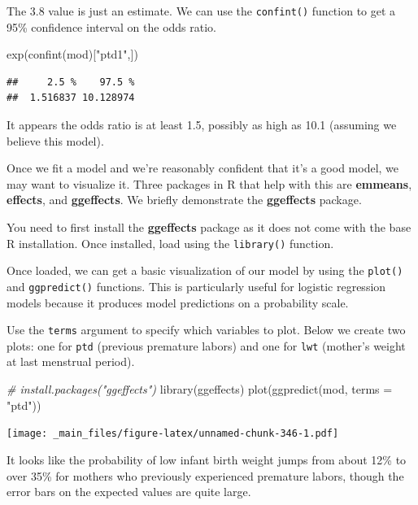 \documentclass[
]{book}
\newenvironment{Shaded}{\begin{snugshade}}{\end{snugshade}}
\newcommand{\AttributeTok}[1]{\textcolor[rgb]{0.77,0.63,0.00}{#1}}
\newcommand{\CommentTok}[1]{\textcolor[rgb]{0.56,0.35,0.01}{\textit{#1}}}
\newcommand{\FunctionTok}[1]{\textcolor[rgb]{0.00,0.00,0.00}{#1}}
\newcommand{\NormalTok}[1]{#1}
\newcommand{\StringTok}[1]{\textcolor[rgb]{0.31,0.60,0.02}{#1}}
\begin{document}
The 3.8 value is just an estimate. We can use the \texttt{confint()} function to get a 95\% confidence interval on the odds ratio.

\begin{Shaded}
\begin{Highlighting}[]
\FunctionTok{exp}\NormalTok{(}\FunctionTok{confint}\NormalTok{(mod)[}\StringTok{"ptd1"}\NormalTok{,])}
\end{Highlighting}
\end{Shaded}

\begin{verbatim}
##     2.5 %    97.5 % 
##  1.516837 10.128974
\end{verbatim}

It appears the odds ratio is at least 1.5, possibly as high as 10.1 (assuming we believe this model).

Once we fit a model and we're reasonably confident that it's a good model, we may want to visualize it. Three packages in R that help with this are \textbf{emmeans}, \textbf{effects}, and \textbf{ggeffects}. We briefly demonstrate the \textbf{ggeffects} package.

You need to first install the \textbf{ggeffects} package as it does not come with the base R installation. Once installed, load using the \texttt{library()} function.

Once loaded, we can get a basic visualization of our model by using the \texttt{plot()} and \texttt{ggpredict()} functions. This is particularly useful for logistic regression models because it produces model predictions on a probability scale.

Use the \texttt{terms} argument to specify which variables to plot. Below we create two plots: one for \texttt{ptd} (previous premature labors) and one for \texttt{lwt} (mother's weight at last menstrual period).

\begin{Shaded}
\begin{Highlighting}[]
\CommentTok{\# install.packages("ggeffects")}
\FunctionTok{library}\NormalTok{(ggeffects)}
\FunctionTok{plot}\NormalTok{(}\FunctionTok{ggpredict}\NormalTok{(mod, }\AttributeTok{terms =} \StringTok{"ptd"}\NormalTok{))}
\end{Highlighting}
\end{Shaded}

\texttt{[image: \_main\_files/figure-latex/unnamed-chunk-346-1.pdf]}

It looks like the probability of low infant birth weight jumps from about 12\% to over 35\% for mothers who previously experienced premature labors, though the error bars on the expected values are quite large.
\end{document}
